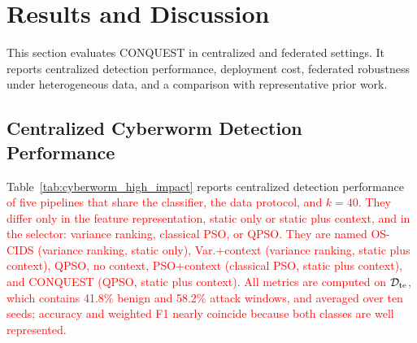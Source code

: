 \documentclass[conference]{IEEEtran}
\begin{document}
\section{\textbf{Results and Discussion}}
\label{sec:results_discussion}

This section evaluates CONQUEST in centralized and federated
settings. It reports centralized detection performance, deployment
cost, federated robustness under heterogeneous data, and a comparison
with representative prior work.

\subsection{Centralized Cyberworm Detection Performance}
\label{subsec:obj1_cyberworm_perf}

Table~\ref{tab:cyberworm_high_impact} reports centralized detection
performance \textcolor{red}{of five pipelines that share the
classifier, the data protocol, and $k=40$. They differ only in the
feature representation, static only or static plus context, and in
the selector: variance ranking, classical PSO, or QPSO. They are named
OS-CIDS (variance ranking, static only), Var.+context (variance
ranking, static plus context), QPSO, no context, PSO+context
(classical PSO, static plus context), and CONQUEST (QPSO, static plus
context). All metrics
are computed on $\mathcal{D}_{\rm te}$, which contains 41.8\% benign
and 58.2\% attack windows, and averaged over ten seeds; accuracy and
weighted F1 nearly coincide because both classes are well
represented.}
\end{document}
